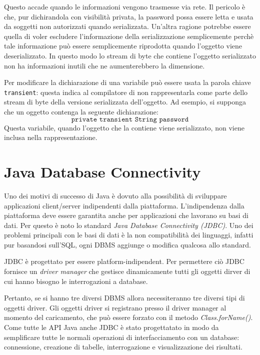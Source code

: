 \documentclass[12pt]{report}
\begin{document}
Questo accade quando le informazioni vengono trasmesse via rete. Il pericolo è che, pur dichirandola con visibilità privata, la password possa essere letta e usata da soggetti non autorizzati quando serializzata. Un'altra ragione potrebbe essere quella di voler escludere l'informazione della serializzazione semplicemente perchè tale informazione può essere semplicemente riprodotta quando l'oggetto viene deserializzato. In questo modo lo stream di byte che contiene l'oggetto serializzato non ha informazioni inutili che ne aumenterebbero la dimensione.

Per modificare la dichiarazione di una variabile può essere usata la parola chiave \texttt{transient}: questa indica al compilatore di non rappresentarla come parte dello stream di byte della versione serializzata dell'oggetto. Ad esempio, si supponga che un oggetto contenga la seguente dichiarazione:
\[
\texttt{private transient String password}
\]
Questa variabile, quando l'oggetto che la contiene viene serializzato, non viene inclusa nella rappresentazione.
\section{Java Database Connectivity}
Uno dei motivi di successo di Java è dovuto alla possibilità di sviluppare applicazioni client/server indipendenti dalla piattaforma. L'indipendenza dalla piattaforma deve essere garantita anche per applicazioni che lavorano su basi di dati. Per questo è noto lo standard \textit{Java Database Connectivity (JDBC)}. Uno dei problemi principali con le basi di dati è la non compatibilità dei linguaggi, infatti pur basandosi sull'SQL, ogni DBMS aggiunge o modifica qualcosa allo standard.

JDBC è progettato per essere platform-indipendent. Per permettere ciò JDBC fornisce un \textit{driver manager} che gestisce dinamicamente tutti gli oggetti dirver di cui hanno bisogno le interrogazioni a database.

Pertanto, se si hanno tre diversi DBMS allora necessiteranno tre diversi tipi di oggetti driver. Gli oggetti driver si registrano presso il driver manager al momento del caricamento, che può essere forzato con il metodo \textit{Class.forName()}. Come tutte le API Java anche JDBC è stato progettatato in modo da semplificare tutte le normali operazioni di interfacciamento con un database: connessione, creazione di tabelle, interrogazione e visualizzazione dei risultati.
\end{document}
